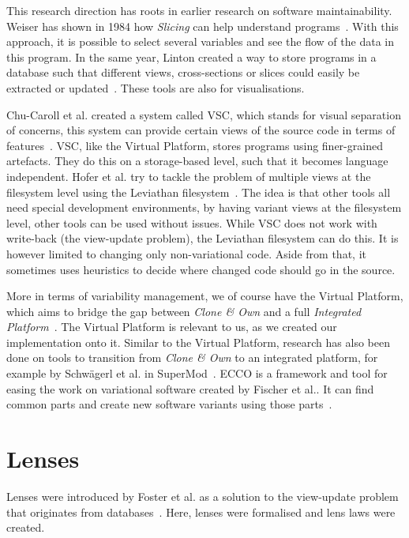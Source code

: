 This research direction has roots in earlier research on software maintainability.
Weiser has shown in 1984 how \emph{Slicing} can help understand programs~\cite{weiser1984program}. With this
approach, it is possible to select several variables and see the flow of
the data in this program. In the same year, Linton created a way to store
programs in a database such that different views, cross-sections or slices
could easily be extracted or updated~\cite{linton1984}. These tools are also
for visualisations.

Chu-Caroll et al. created a system called VSC, which stands for visual
separation of concerns, this system can provide certain views of the source
code in terms of features~\cite{chu2003visual}. VSC, like the Virtual Platform,
stores programs using finer-grained artefacts. They do this on a storage-based
level, such that it becomes language independent. Hofer et al. try to tackle
the problem of multiple views at the filesystem level using the Leviathan
filesystem~\cite{hofer2010toolchain}. The idea is that other tools all need
special development environments, by having variant views at the filesystem
level, other tools can be used without issues. While VSC does not work with
write-back (the view-update problem), the Leviathan filesystem can do this.
It is however limited to changing only non-variational code. Aside from that, it sometimes
uses heuristics to decide where changed code should go in the source.

More in terms of variability management, we of course have the Virtual
Platform, which aims to bridge the gap between \emph{Clone \& Own} and a full
\emph{Integrated Platform}~\cite{mahmood2021}. The Virtual Platform is relevant
to us, as we created our implementation onto it. Similar to the Virtual Platform,
research has also been done on tools to transition from \emph{Clone \& Own} to an
integrated platform, for example by Schw{\"a}gerl et al. in SuperMod~\cite{schwagerl2015}.
ECCO is a framework and tool for easing the work on variational software created
by Fischer et al.. It can find common parts and create new software variants
using those parts~\cite{fischer2014enhancing}. 

\section{Lenses}
Lenses were introduced by Foster et al. as a solution to the view-update
problem that originates from databases~\cite{foster2007}. Here, lenses were
formalised and lens laws were created.

